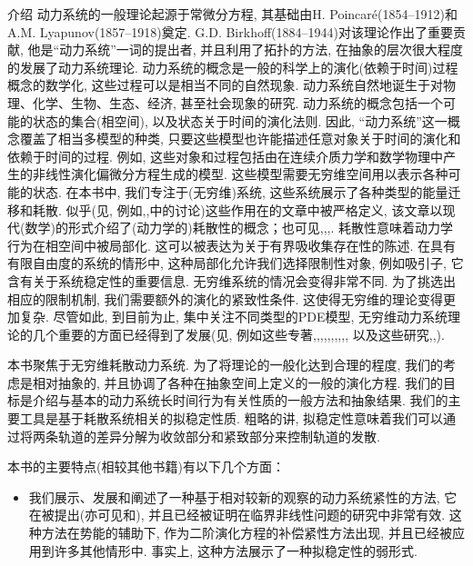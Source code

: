 \begin{PreChapter}{介\quad 绍}
	动力系统的一般理论起源于常微分方程, 其基础由H. Poincaré(1854–1912)和A.M. Lyapunov(1857–1918)奠定. G.D. Birkhoff(1884–1944)对该理论作出了重要贡献, 他是“动力系统”一词的提出者, 并且利用了拓扑的方法, 在抽象的层次很大程度的发展了动力系统理论. 动力系统的概念是一般的科学上的演化(依赖于时间)过程概念的数学化, 这些过程可以是相当不同的自然现象. 动力系统自然地诞生于对物理、化学、生物、生态、经济, 甚至社会现象的研究. 动力系统的概念包括一个可能的状态的集合(相空间), 以及状态关于时间的演化法则. 因此, “动力系统”这一概念覆盖了相当多模型的种类, 只要这些模型也许能描述任意对象关于时间的演化和依赖于时间的过程. 例如, 这些对象和过程包括由在连续介质力学和数学物理中产生的非线性演化偏微分方程生成的模型. 这些模型需要无穷维空间用以表示各种可能的状态. 在本书中, 我们专注于(无穷维)系统, 这些系统展示了各种类型的能量迁移和耗散. 似乎(见, 例如\cite{Hale88},\cite{Raugel02},\cite{Temam97}中的讨论)这些作用在\cite{Levinson45}的文章中被严格定义, 该文章以现代(数学)的形式介绍了(动力学的)耗散性的概念；也可见\cite{Billoti71},\cite{Coddington55},\cite{Pliss66},\cite{Pliss77}. 耗散性意味着动力学行为在相空间中被局部化. 这可以被表达为关于有界吸收集存在性的陈述. 在具有有限自由度的系统的情形中, 这种局部化允许我们选择限制性对象, 例如吸引子, 它含有关于系统稳定性的重要信息. 无穷维系统的情况会变得非常不同. 为了挑选出相应的限制机制, 我们需要额外的演化的紧致性条件. 这使得无穷维的理论变得更加复杂. 尽管如此, 到目前为止, 集中关注不同类型的PDE模型, 无穷维动力系统理论的几个重要的方面已经得到了发展(见, 例如这些专著\cite{Babin92},\cite{Chepyzhov02},\cite{Chueshov99},\cite{Chueshov10},\cite{Chueshov08},\cite{Hale88},\cite{Ladyzhenskaya91},\cite{Robinson01},\cite{Sell02},\cite{Temam97}, 以及这些研究\cite{Babin06},\cite{Miranville08},\cite{Raugel02}). 
	
	本书聚焦于无穷维耗散动力系统. 为了将理论的一般化达到合理的程度, 我们的考虑是相对抽象的, 并且协调了各种在抽象空间上定义的一般的演化方程. 我们的目标是介绍与基本的动力系统长时间行为有关性质的一般方法和抽象结果. 我们的主要工具是基于耗散系统相关的拟稳定性质. 粗略的讲, 拟稳定性意味着我们可以通过将两条轨道的差异分解为收敛部分和紧致部分来控制轨道的发散. 
	
	本书的主要特点(相较其他书籍)有以下几个方面：

	\begin{itemize}
		\item 我们展示、发展和阐述了一种基于相对较新的观察的动力系统紧性的方法, 它在\cite{Khanmamedov06}被提出(亦可见\cite{Chueshov08}和\cite{Chueshov10}), 并且已经被证明在临界非线性问题的研究中非常有效. 这种方法在势能的辅助下, 作为二阶演化方程的补偿紧性方法出现, 并且已经被应用到许多其他情形中. 事实上, 这种方法展示了一种拟稳定性的弱形式. 
		

\end{itemize}
\end{PreChapter}
